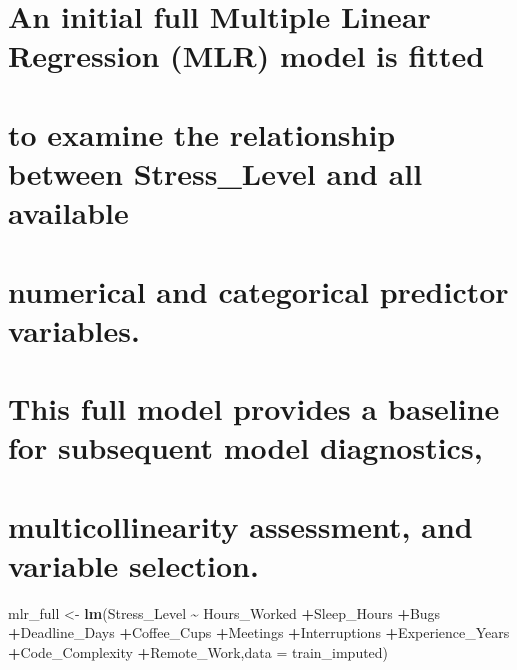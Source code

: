 \documentclass[
]{article}
\newenvironment{Shaded}{\begin{snugshade}}{\end{snugshade}}
\newcommand{\AttributeTok}[1]{\textcolor[rgb]{0.13,0.29,0.53}{#1}}
\newcommand{\FunctionTok}[1]{\textcolor[rgb]{0.13,0.29,0.53}{\textbf{#1}}}
\newcommand{\NormalTok}[1]{#1}
\newcommand{\OtherTok}[1]{\textcolor[rgb]{0.56,0.35,0.01}{#1}}
\newcommand{\SpecialCharTok}[1]{\textcolor[rgb]{0.81,0.36,0.00}{\textbf{#1}}}
\begin{document}
\section{An initial full Multiple Linear Regression (MLR) model is
fitted}\label{an-initial-full-multiple-linear-regression-mlr-model-is-fitted}

\section{to examine the relationship between Stress\_Level and all
available}\label{to-examine-the-relationship-between-stress_level-and-all-available}

\section{numerical and categorical predictor
variables.}\label{numerical-and-categorical-predictor-variables.}

\section{}\label{section}

\section{This full model provides a baseline for subsequent model
diagnostics,}\label{this-full-model-provides-a-baseline-for-subsequent-model-diagnostics}

\section{multicollinearity assessment, and variable
selection.}\label{multicollinearity-assessment-and-variable-selection.}

\begin{Shaded}
\begin{Highlighting}[]
\NormalTok{mlr\_full }\OtherTok{\textless{}{-}} \FunctionTok{lm}\NormalTok{(Stress\_Level }\SpecialCharTok{\textasciitilde{}}\NormalTok{ Hours\_Worked }\SpecialCharTok{+}\NormalTok{Sleep\_Hours }\SpecialCharTok{+}\NormalTok{Bugs }\SpecialCharTok{+}\NormalTok{Deadline\_Days }\SpecialCharTok{+}\NormalTok{Coffee\_Cups }\SpecialCharTok{+}\NormalTok{Meetings }\SpecialCharTok{+}\NormalTok{Interruptions }\SpecialCharTok{+}\NormalTok{Experience\_Years }\SpecialCharTok{+}\NormalTok{Code\_Complexity }\SpecialCharTok{+}\NormalTok{Remote\_Work,}\AttributeTok{data =}\NormalTok{ train\_imputed)}
\end{Highlighting}
\end{Shaded}
\end{document}
